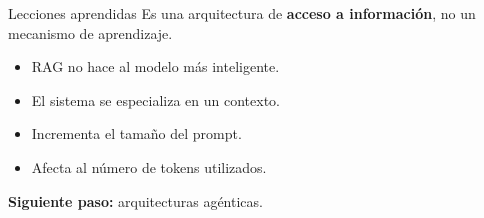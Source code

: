 \documentclass[aspectratio=169]{beamer}
\begin{document}

\begin{frame}{Lecciones aprendidas}
Es una arquitectura de \textbf{acceso a información}, no un mecanismo de aprendizaje.
\vspace{1.5em}
\begin{itemize}
    \item RAG no hace al modelo más inteligente.
    \item El sistema se especializa en un contexto.
    \item Incrementa el tamaño del prompt.
    \item Afecta al número de tokens utilizados.
\end{itemize}
\vspace{1.5em}
\textbf{Siguiente paso:} arquitecturas agénticas.
\end{frame}
\end{document}
